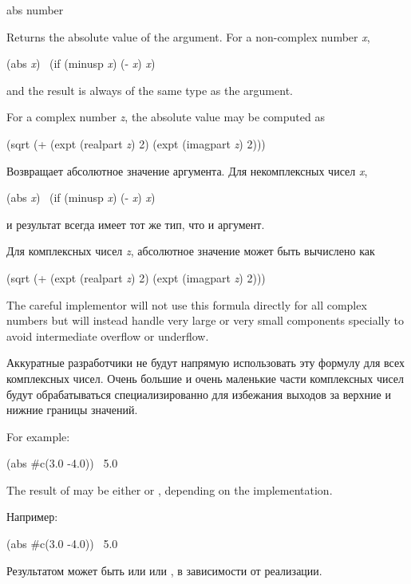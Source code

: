 \begin{defun}[Function]
abs number

Returns the absolute value of the argument.  For a non-complex number \emph{x},
\begin{lisp}
(abs \emph{x}) \EQ\ (if (minusp \emph{x}) (- \emph{x}) \emph{x})
\end{lisp}
and the result is always of the same type as the argument.

For a complex number \emph{z}, the absolute value may be computed as
\begin{lisp}
(sqrt (+ (expt (realpart \emph{z}) 2) (expt (imagpart \emph{z}) 2)))
\end{lisp}

Возвращает абсолютное значение аргумента. Для некомплексных чисел \emph{x}, 
\begin{lisp}
(abs \emph{x}) \EQ\ (if (minusp \emph{x}) (- \emph{x}) \emph{x})
\end{lisp}
и результат всегда имеет тот же тип, что и аргумент.

Для комплексных чисел \emph{z}, абсолютное значение может быть вычислено как
\begin{lisp}
(sqrt (+ (expt (realpart \emph{z}) 2) (expt (imagpart \emph{z}) 2)))
\end{lisp}

\beforenoterule
\begin{implementation}
The careful implementor will not use this formula directly
for all complex numbers
but will instead handle very large or very small components specially
to avoid intermediate overflow or underflow.

Аккуратные разработчики не будут напрямую использовать эту формулу для всех
комплексных чисел. Очень большие и очень маленькие части комплексных чисел будут
обрабатываться специализированно для избежания выходов за верхние и нижние
границы значений.
\end{implementation}
\afternoterule

For example:
\begin{lisp}
(abs \#c(3.0 -4.0)) \EV\ 5.0
\end{lisp}
The result of  may be either  or ,
depending on the implementation.

Например:
\begin{lisp}
(abs \#c(3.0 -4.0)) \EV\ 5.0
\end{lisp}
Результатом  может быть или  или , в зависимости
от реализации.
\end{defun}


